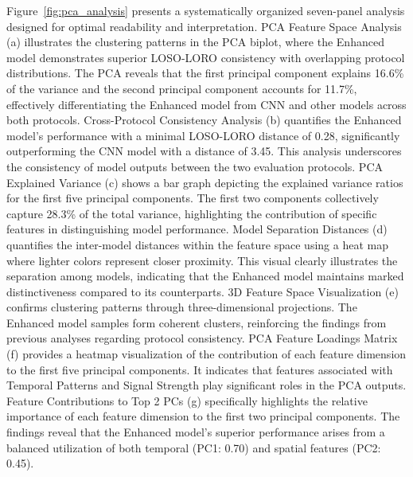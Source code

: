 \documentclass[journal]{IEEEtran}
\begin{document}
Figure~\ref{fig:pca_analysis} presents a systematically organized seven-panel analysis designed for optimal readability and interpretation. 
PCA Feature Space Analysis (a) illustrates the clustering patterns in the PCA biplot, where the Enhanced model demonstrates superior LOSO-LORO consistency with overlapping protocol distributions. The PCA reveals that the first principal component explains 16.6\% of the variance and the second principal component accounts for 11.7\%, effectively differentiating the Enhanced model from CNN and other models across both protocols. 
Cross-Protocol Consistency Analysis (b) quantifies the Enhanced model's performance with a minimal LOSO-LORO distance of 0.28, significantly outperforming the CNN model with a distance of 3.45. This analysis underscores the consistency of model outputs between the two evaluation protocols. 
PCA Explained Variance (c) shows a bar graph depicting the explained variance ratios for the first five principal components. The first two components collectively capture 28.3\% of the total variance, highlighting the contribution of specific features in distinguishing model performance. 
Model Separation Distances (d) quantifies the inter-model distances within the feature space using a heat map where lighter colors represent closer proximity. This visual clearly illustrates the separation among models, indicating that the Enhanced model maintains marked distinctiveness compared to its counterparts.
3D Feature Space Visualization (e) confirms clustering patterns through three-dimensional projections. The Enhanced model samples form coherent clusters, reinforcing the findings from previous analyses regarding protocol consistency.
PCA Feature Loadings Matrix (f) provides a heatmap visualization of the contribution of each feature dimension to the first five principal components. It indicates that features associated with Temporal Patterns and Signal Strength play significant roles in the PCA outputs.
Feature Contributions to Top 2 PCs (g) specifically highlights the relative importance of each feature dimension to the first two principal components. The findings reveal that the Enhanced model's superior performance arises from a balanced utilization of both temporal (PC1: 0.70) and spatial features (PC2: 0.45).
\end{document}
